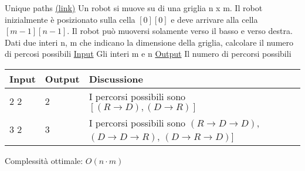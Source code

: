 \begin{esercizio}{Unique paths \href{https://leetcode.com/problems/unique-paths/description/}{(link)} }
	Un robot si muove su di una griglia {\ttfamily n x m}. Il robot inizialmente è posizionato sulla cella $ \left[0\right]\left[0\right] $ e deve arrivare alla cella $ \left[m-1\right]\left[n-1\right] $. Il robot può muoversi solamente verso il basso e verso destra. Dati due interi {\ttfamily n, m} che indicano la dimensione della griglia, calcolare il numero di percosi possibili
	\vskip3mm
	\vskip3mm
	\underline{Input}
	\vskip3mm
	Gli interi {\ttfamily m} e {\ttfamily n}
	\vskip3mm
	\underline{Output}
	\vskip3mm
	Il numero di percorsi possibili
	\renewcommand{\cellalign}{l}
	\begin{center}
		\begin{tabularx}{\textwidth}{llX}
			\toprule
			Input & Output & Discussione                                                                                        \\
			\midrule
			2 2   & 2      & I percorsi possibili sono $[(R \rightarrow D), (D \rightarrow R)]$                                 \\[12pt]
			3 2   & 3      & I percorsi possibili sono \vskip0mm
			$(R \rightarrow D \rightarrow D)$, $(D \rightarrow D \rightarrow R)$, $\left(D \rightarrow R \rightarrow D\right)]$ \\
			\bottomrule
		\end{tabularx}
	\end{center}
	Complessità ottimale: $ O\left(n \cdot  m\right) $
\end{esercizio}\label{uniquepaths}

